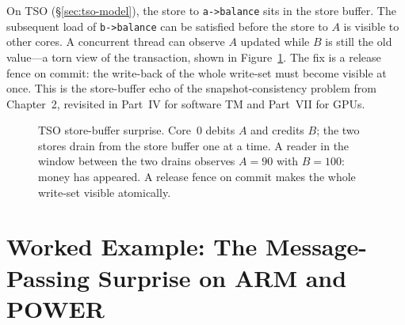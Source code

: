On TSO (\S\ref{sec:tso-model}), the store to \texttt{a->balance} sits in the store
buffer. The subsequent load of \texttt{b->balance} can be satisfied before
the store to $A$ is visible to other cores. A concurrent thread can observe
$A$ updated while $B$ is still the old value---a torn view of the
transaction, shown in Figure~\ref{fig:tso-store-buffer}. The fix is a
release fence on commit: the write-back of the whole write-set must become
visible at once. This is the store-buffer echo of the snapshot-consistency
problem from Chapter~2, revisited in Part~IV for software TM and Part~VII
for GPUs.

\begin{figure}[htbp]
\centering
{}
\caption{TSO store-buffer surprise. Core~0 debits $A$ and credits $B$;
the two stores drain from the store buffer one at a time. A reader in the
window between the two drains observes $A{=}90$ with $B{=}100$: money has
appeared. A release fence on commit makes the whole write-set visible
atomically.}
\label{fig:tso-store-buffer}
\end{figure}

\section[The Message-Passing Surprise]{Worked Example: The Message-Passing Surprise on ARM and POWER}
\label{sec:mp-example}

